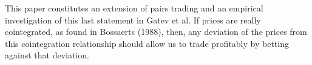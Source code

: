 


This paper constitutes an extension of pairs trading and an empirical investigation of this last statement in Gatev et al. If prices are really cointegrated, as found in Bossaerts (1988), then, any deviation of the prices from this cointegration relationship should allow us to trade profitably by betting against that deviation.

